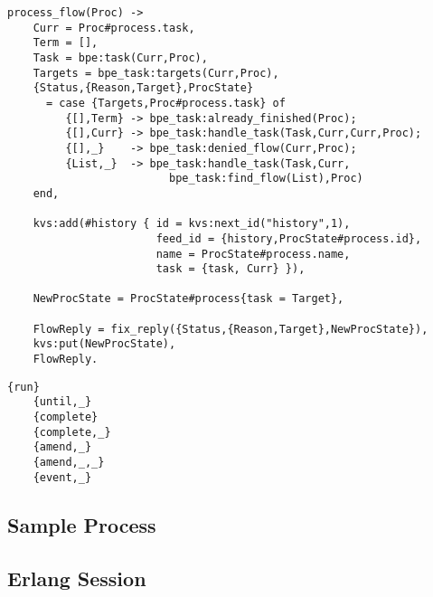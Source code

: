 \vspace{1\baselineskip}
\begin{lstlisting}[caption=Flow Processing]
process_flow(Proc) ->
    Curr = Proc#process.task,
    Term = [],
    Task = bpe:task(Curr,Proc),
    Targets = bpe_task:targets(Curr,Proc),
    {Status,{Reason,Target},ProcState}
      = case {Targets,Proc#process.task} of
         {[],Term} -> bpe_task:already_finished(Proc);
         {[],Curr} -> bpe_task:handle_task(Task,Curr,Curr,Proc);
         {[],_}    -> bpe_task:denied_flow(Curr,Proc);
         {List,_}  -> bpe_task:handle_task(Task,Curr,
                         bpe_task:find_flow(List),Proc)
    end,

    kvs:add(#history { id = kvs:next_id("history",1),
                       feed_id = {history,ProcState#process.id},
                       name = ProcState#process.name,
                       task = {task, Curr} }),

    NewProcState = ProcState#process{task = Target},

    FlowReply = fix_reply({Status,{Reason,Target},NewProcState}),
    kvs:put(NewProcState),
    FlowReply.
\end{lstlisting}

\vspace{1\baselineskip}
\begin{lstlisting}[caption=BPE protocol]
    {run}
    {until,_}
    {complete}
    {complete,_}
    {amend,_}
    {amend,_,_}
    {event,_}
\end{lstlisting}

\subsection{Sample Process}

\subsection{Erlang Session}

